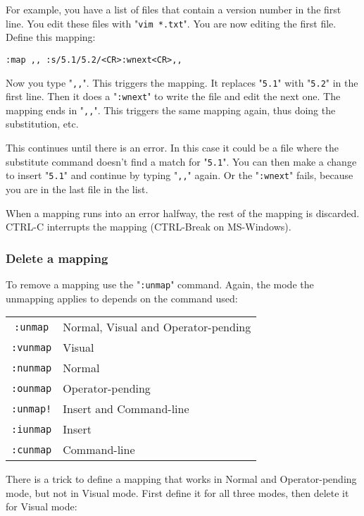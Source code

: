 {For example, you have a list of files that contain a version number in the first line.
You edit these files with "\verb!vim *.txt!".
You are now editing the first file.
Define this mapping:

\begin{Verbatim}[samepage=true]
 :map ,, :s/5.1/5.2/<CR>:wnext<CR>,,
\end{Verbatim}

Now you type "\verb!,,!".
This triggers the mapping.
It replaces "\verb!5.1!" with "\verb!5.2!" in the first line.
Then it does a "\verb!:wnext!" to write the file and edit the next one.
The mapping ends in "\verb!,,!".
This triggers the same mapping again, thus doing the substitution, etc.

This continues until there is an error.
In this case it could be a file where the substitute command doesn't find a match for "\verb!5.1!".
You can then make a change to insert "\verb!5.1!" and continue by typing "\verb!,,!" again.
Or the "\verb!:wnext!" fails, because you are in the last file in the list.

When a mapping runs into an error halfway, the rest of the mapping is discarded.
CTRL-C interrupts the mapping (CTRL-Break on MS-Windows).
\subsubsection{Delete a mapping}
To remove a mapping use the "\verb!:unmap!" command.
Again, the mode the unmapping applies to depends on the command used:

\begin{center} \begin{tabular}{c l}
				\verb;:unmap; & Normal, Visual and Operator-pending \\
				\verb;:vunmap; & Visual \\
				\verb;:nunmap; & Normal \\
				\verb;:ounmap; & Operator-pending \\
				\verb;:unmap!; & Insert and Command-line \\
				\verb;:iunmap; & Insert \\
				\verb;:cunmap; & Command-line \\
\end{tabular} \end{center}

There is a trick to define a mapping that works in Normal and Operator-pending mode, but not in Visual mode.
First define it for all three modes, then delete it for Visual mode:

}
